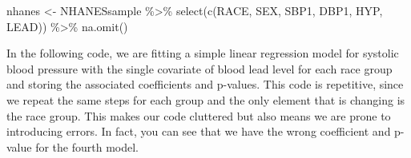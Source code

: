 \documentclass[
  letterpaper,
]{latex/krantz}
\makeatletter
\newenvironment{Shaded}{\begin{snugshade}}{\end{snugshade}}
\newcommand{\FunctionTok}[1]{\textcolor[rgb]{0.28,0.35,0.67}{#1}}
\newcommand{\NormalTok}[1]{\textcolor[rgb]{0.00,0.23,0.31}{#1}}
\newcommand{\OtherTok}[1]{\textcolor[rgb]{0.00,0.23,0.31}{#1}}
\newcommand{\SpecialCharTok}[1]{\textcolor[rgb]{0.37,0.37,0.37}{#1}}
\newenvironment{kframe}{%
\medskip{}
\setlength{\fboxsep}{.8em}
 \def\at@end@of@kframe{}%
 \ifinner\ifhmode%
  \def\at@end@of@kframe{\end{minipage}}%
  \begin{minipage}{\columnwidth}%
 \fi\fi%
 \def\FrameCommand##1{\hskip\@totalleftmargin \hskip-\fboxsep
 \colorbox{shadecolor}{##1}\hskip-\fboxsep
     \hskip-\linewidth \hskip-\@totalleftmargin \hskip\columnwidth}%
 \MakeFramed {\advance\hsize-\width
   \@totalleftmargin\z@ \linewidth\hsize
   \@setminipage}}%
 {\par\unskip\endMakeFramed%
 \at@end@of@kframe}
\renewenvironment{Shaded}{\begin{kframe}}{\end{kframe}}
\makeatother
\begin{document}
\begin{Shaded}
\begin{Highlighting}[]
\NormalTok{nhanes }\OtherTok{\textless{}{-}}\NormalTok{ NHANESsample }\SpecialCharTok{\%\textgreater{}\%} 
  \FunctionTok{select}\NormalTok{(}\FunctionTok{c}\NormalTok{(RACE, SEX, SBP1, DBP1, HYP, LEAD)) }\SpecialCharTok{\%\textgreater{}\%}
  \FunctionTok{na.omit}\NormalTok{()}
\end{Highlighting}
\end{Shaded}

In the following code, we are fitting a simple linear regression model
for systolic blood pressure with the single covariate of blood lead
level for each race group and storing the associated coefficients and
p-values. This code is repetitive, since we repeat the same steps for
each group and the only element that is changing is the race group. This
makes our code cluttered but also means we are prone to introducing
errors. In fact, you can see that we have the wrong coefficient and
p-value for the fourth model.
\end{document}

